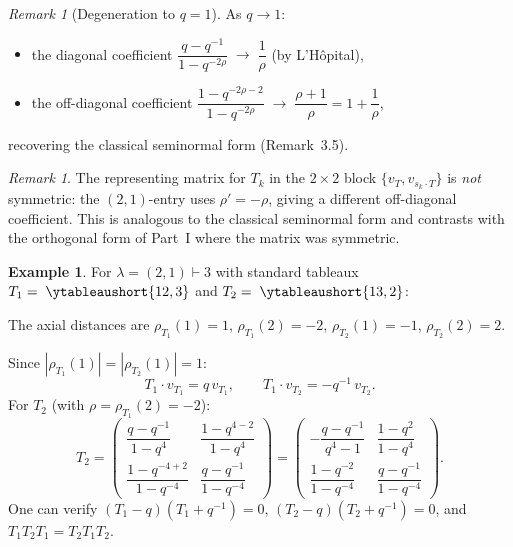 \documentclass[12pt,a4paper]{article}
\theoremstyle{definition}
\newtheorem{example}[theorem]{Example}
\theoremstyle{remark}
\newtheorem{remark}[theorem]{Remark}
\begin{document}
\begin{remark}[Degeneration to $q = 1$]
As $q \to 1$:
\begin{itemize}
\item the diagonal coefficient
  $\dfrac{q - q^{-1}}{1 - q^{-2\rho}} \;\to\; \dfrac{1}{\rho}$
  (by L'H\^opital),
\item the off-diagonal coefficient
  $\dfrac{1 - q^{-2\rho-2}}{1 - q^{-2\rho}} \;\to\;
  \dfrac{\rho + 1}{\rho} = 1 + \dfrac{1}{\rho}$,
\end{itemize}
recovering the classical seminormal form (Remark~3.5).
\end{remark}

\begin{remark}
The representing matrix for $T_k$ in the $2 \times 2$ block
$\{v_T, v_{s_k \cdot T}\}$ is \emph{not} symmetric: the
$(2,1)$-entry uses $\rho' = -\rho$, giving a different off-diagonal
coefficient. This is analogous to the classical seminormal form and
contrasts with the orthogonal form of Part~I where the matrix was
symmetric.
\end{remark}

\begin{example}\label{ex:q-S3-21}
For $\lambda = (2,1) \vdash 3$ with standard tableaux
$T_1 = \;\ytableaushort{12,3}$ and $T_2 = \;\ytableaushort{13,2}$:

The axial distances are $\rho_{T_1}(1) = 1$, $\rho_{T_1}(2) = -2$,
$\rho_{T_2}(1) = -1$, $\rho_{T_2}(2) = 2$.

Since $|\rho_{T_1}(1)| = |\rho_{T_2}(1)| = 1$:
\[
  T_1 \cdot v_{T_1} = q\, v_{T_1}, \qquad
  T_1 \cdot v_{T_2} = -q^{-1}\, v_{T_2}.
\]
For $T_2$ (with $\rho = \rho_{T_1}(2) = -2$):
\[
  T_2 = \begin{pmatrix}
    \dfrac{q - q^{-1}}{1 - q^4} &
    \dfrac{1 - q^{4-2}}{1 - q^4} \\[10pt]
    \dfrac{1 - q^{-4+2}}{1 - q^{-4}} &
    \dfrac{q - q^{-1}}{1 - q^{-4}}
  \end{pmatrix}
  = \begin{pmatrix}
    -\dfrac{q - q^{-1}}{q^4 - 1} &
    \dfrac{1 - q^2}{1 - q^4} \\[10pt]
    \dfrac{1 - q^{-2}}{1 - q^{-4}} &
    \dfrac{q - q^{-1}}{1 - q^{-4}}
  \end{pmatrix}.
\]
One can verify $(T_1 - q)(T_1 + q^{-1}) = 0$,
$(T_2 - q)(T_2 + q^{-1}) = 0$, and $T_1 T_2 T_1 = T_2 T_1 T_2$.
\end{example}

\end{document}
